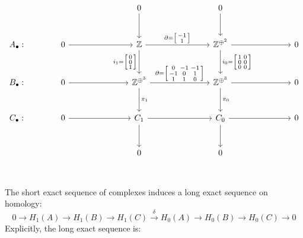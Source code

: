 \documentclass[11pt,a4paper]{report}
\begin{document}
\begin{Ex}
                \[
                  \begin{tikzcd}[ampersand replacement=\&, sep=large]
                        \& \            \&  \& 0 \arrow[d] \&  \& 0 \arrow[d] \& \& \\
                    A_\bullet: \& 0 \arrow[rr] \&  \& \mathbb{Z} \arrow[rr, "\partial = {\left[\begin{smallmatrix}-1\\1\end{smallmatrix}\right]}"] \arrow[d,swap,"i_1 = {\left[\begin{smallmatrix}0\\0\\1\end{smallmatrix}\right]}"] \&  \& \mathbb{Z}^{\oplus^{2}} \arrow[rr] \arrow[d, "i_0 = {\left[\begin{smallmatrix}1&0\\0&0\\0&0\end{smallmatrix}\right]}"] \&  \& 0\\
                    B_\bullet: \& 0 \arrow[rr] \&  \& \mathbb{Z}^{\oplus^{3}} \arrow[rr, "\partial = {\left[\begin{smallmatrix}0&-1&-1\\-1&0&1\\1&1&0\end{smallmatrix}\right]}"] \arrow[d, "\pi_1"] \&  \& \mathbb{Z}^{\oplus^{3}} \arrow[d, "\pi_0"] \arrow[rr] \&  \& 0\\
                    C_\bullet: \& 0 \arrow[rr] \&  \& C_1        \arrow[rr] \arrow[d] \&  \& C_0               \arrow[d] \arrow[rr] \&  \& 0\\
                        \& \            \&  \& 0                               \&  \& 0\\
                  \end{tikzcd}
                \]
                The short exact sequence of complexes induces a long exact sequence on homology: 
                \[ 
                0 \rightarrow H_1(A) \rightarrow H_1(B) \rightarrow H_1(C) \xrightarrow{\delta} H_0(A) \rightarrow H_0(B) \rightarrow H_0(C) \rightarrow 0 \]
                Explicitly, the long exact sequence is:
            

\end{Ex}
\end{document}
